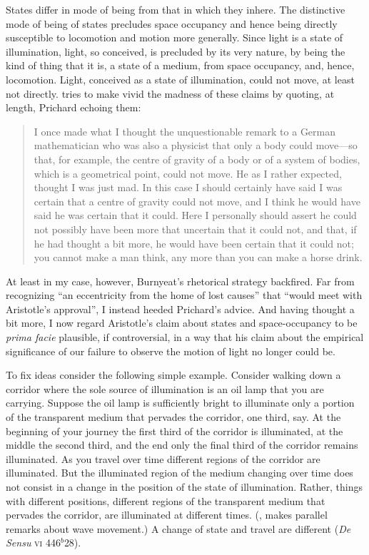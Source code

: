 States differ in mode of being from that in which they inhere. The distinctive mode of being of states precludes space occupancy and hence being directly susceptible to locomotion and motion more generally. Since light is a state of illumination, light, so conceived, is precluded by its very nature, by being the kind of thing that it is, a state of a medium, from space occupancy, and, hence, locomotion. Light, conceived as a state of illumination, could not move, at least not directly. \citet[430 n29; appendix]{Burnyeat:1995fk} tries to make vivid the madness of these claims by quoting, at length, Prichard echoing them:
\begin{quote}
	I once made what I thought the unquestionable remark to a German mathematician who was also a physicist that only a body could move---so that, for example, the centre of gravity of a body or of a system of bodies, which is a geometrical point, could not move. He as I rather expected, thought I was just mad. In this case I should certainly have said I was certain that a centre of gravity could not move, and I think he would have said he was certain that it could. Here I personally should assert he could not possibly have been more that uncertain that it could not, and that, if he had thought a bit more, he would have been certain that it could not; you cannot make a man think, any more than you can make a horse drink. \citep[99; this is just the initial paragraph of the material that Burnyeat quotes]{Prichard:1950tg}
\end{quote}
At least in my case, however, Burnyeat's \citeyearpar[430 n29]{Burnyeat:1995fk} rhetorical strategy backfired. Far from recognizing ``an eccentricity from the home of lost causes'' that ``would meet with Aristotle's approval'', I instead heeded Prichard's advice. And having thought a bit more, I now regard Aristotle's claim about states and space-occupancy to be \emph{prima facie} plausible, if controversial, in a way that his claim about the empirical significance of our failure to observe the motion of light no longer could be.

To fix ideas consider the following simple example. Consider walking down a corridor where the sole source of illumination is an oil lamp that you are carrying. Suppose the oil lamp is sufficiently bright to illuminate only a portion of the transparent medium that pervades the corridor, one third, say. At the beginning of your journey the first third of the corridor is illuminated, at the middle the second third, and the end only the final third of the corridor remains illuminated. As you travel over time different regions of the corridor are illuminated. But the illuminated region of the medium changing over time does not consist in a change in the position of the state of illumination. Rather, things with different positions, different regions of the transparent medium that pervades the corridor, are illuminated at different times. (\citealt[99]{Prichard:1950tg}, makes parallel remarks about wave movement.) A change of state and travel are different (\emph{De Sensu} \textsc{vi} 446\( ^{b} \)28).


